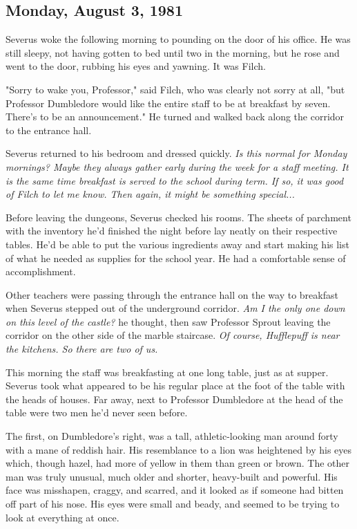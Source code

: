 \subsection{Monday, August 3, 1981}

Severus woke the following morning to pounding on the door of his office. He was still sleepy, not having gotten to bed until two in the morning, but he rose and went to the door, rubbing his eyes and yawning. It was Filch.

"Sorry to wake you, Professor," said Filch, who was clearly not sorry at all, "but Professor Dumbledore would like the entire staff to be at breakfast by seven. There's to be an announcement." He turned and walked back along the corridor to the entrance hall.

Severus returned to his bedroom and dressed quickly. \emph{Is this normal for Monday mornings? Maybe they always gather early during the week for a staff meeting. It is the same time breakfast is served to the school during term. If so, it was good of Filch to let me know. Then again, it might be something special...}

Before leaving the dungeons, Severus checked his rooms. The sheets of parchment with the inventory he'd finished the night before lay neatly on their respective tables. He'd be able to put the various ingredients away and start making his list of what he needed as supplies for the school year. He had a comfortable sense of accomplishment.

Other teachers were passing through the entrance hall on the way to breakfast when Severus stepped out of the underground corridor. \emph{Am I the only one down on this level of the castle?} he thought, then saw Professor Sprout leaving the corridor on the other side of the marble staircase. \emph{Of course, Hufflepuff is near the kitchens. So there are two of us.}

This morning the staff was breakfasting at one long table, just as at supper. Severus took what appeared to be his regular place at the foot of the table with the heads of houses. Far away, next to Professor Dumbledore at the head of the table were two men he'd never seen before.

The first, on Dumbledore's right, was a tall, athletic-looking man around forty with a mane of reddish hair. His resemblance to a lion was heightened by his eyes which, though hazel, had more of yellow in them than green or brown. The other man was truly unusual, much older and shorter, heavy-built and powerful. His face was misshapen, craggy, and scarred, and it looked as if someone had bitten off part of his nose. His eyes were small and beady, and seemed to be trying to look at everything at once.

